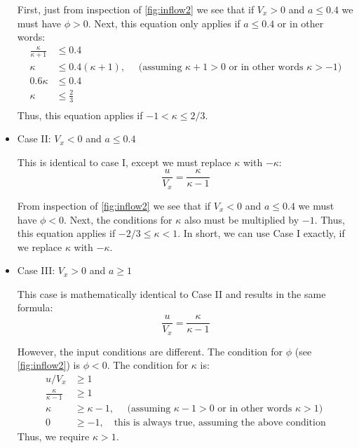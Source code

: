 \documentclass{article}
\begin{document}
\begin{itemize}
First, just from inspection of \cref{fig:inflow2} we see that if $V_x > 0$ and $a \le 0.4$ we must have $\phi > 0$.  Next, this equation only applies if $a \le 0.4$ or in other words:
\begin{equation}
    \begin{aligned}
        \frac{\kappa}{\kappa + 1} &\le 0.4\\
        \kappa &\le 0.4 (\kappa + 1) ,\quad \text{ (assuming $\kappa + 1 > 0$ or in other words $\kappa > -1$)}\\
        0.6 \kappa &\le 0.4 \\
        \kappa &\le \frac{2}{3} \\
    \end{aligned}
\end{equation}
Thus, this equation applies if $-1 < \kappa \le 2/3$.

\item Case II: $V_x < 0$ and $a \le 0.4$

This is identical to case I, except we must replace $\kappa$ with $-\kappa$:
\begin{equation}
    \frac{u}{V_x} = \frac{\kappa}{\kappa - 1}
\end{equation}

From inspection of \cref{fig:inflow2} we see that if $V_x < 0$ and $a \le 0.4$ we must have $\phi < 0$.  Next, the conditions for $\kappa$ also must be multiplied by $-1$.  Thus, this equation applies if $-2/3 \le \kappa < 1$.  In short, we can use Case I exactly, if we replace $\kappa$ with $-\kappa$.


\item Case III: $V_x > 0$ and $a \ge 1$

This case is mathematically identical to Case II and results in the same formula:
\begin{equation}
    \frac{u}{V_x} = \frac{\kappa}{\kappa - 1}
\end{equation}

However, the input conditions are different.  The condition for $\phi$ (see \cref{fig:inflow2}) is $\phi < 0$.  The condition for $\kappa$ is:
\begin{equation}
    \begin{aligned}
        u/V_x &\ge 1\\
        \frac{\kappa}{\kappa -1} &\ge 1\\
        \kappa &\ge \kappa -1,\quad \text{ (assuming $\kappa - 1 > 0$ or in other words $\kappa > 1$)} \\
        0 &\ge -1,\quad \text{this is always true, assuming the above condition}
    \end{aligned}
\end{equation}
Thus, we require $\kappa > 1$.


\end{itemize}
\end{document}
